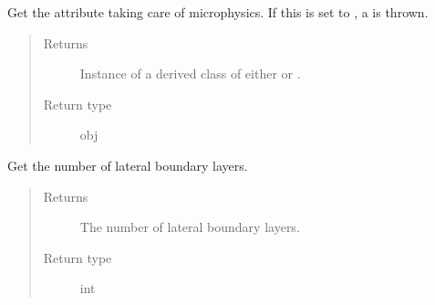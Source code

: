 \documentclass[letterpaper,10pt,english]{sphinxmanual}
\begin{document}
\begin{fulllineitems}

\begin{fulllineitems}
\label{\detokenize{api:dycore.prognostic_isentropic_nonconservative.PrognosticIsentropicNonconservative.microphysics}}
Get the attribute taking care of microphysics.
If this is set to , a  is thrown.
\begin{quote}\begin{description}
\item[{Returns}] \leavevmode
Instance of a derived class of either 
or .

\item[{Return type}] \leavevmode
obj

\end{description}\end{quote}

\end{fulllineitems}


\begin{fulllineitems}
\label{\detokenize{api:dycore.prognostic_isentropic_nonconservative.PrognosticIsentropicNonconservative.nb}}
Get the number of lateral boundary layers.
\begin{quote}\begin{description}
\item[{Returns}] \leavevmode
The number of lateral boundary layers.

\item[{Return type}] \leavevmode
int

\end{description}\end{quote}

\end{fulllineitems}



\end{fulllineitems}
\end{document}
